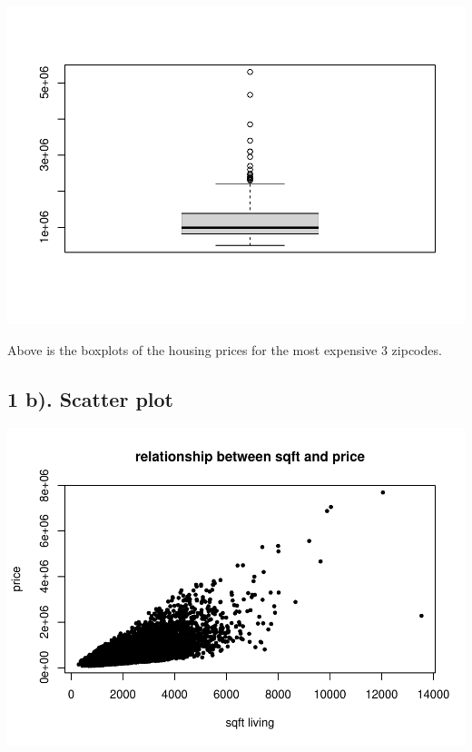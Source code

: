 \documentclass[
]{article}
\newenvironment{Shaded}{\begin{snugshade}}{\end{snugshade}}
\newcommand{\DataTypeTok}[1]{\textcolor[rgb]{0.13,0.29,0.53}{#1}}
\newcommand{\DecValTok}[1]{\textcolor[rgb]{0.00,0.00,0.81}{#1}}
\newcommand{\KeywordTok}[1]{\textcolor[rgb]{0.13,0.29,0.53}{\textbf{#1}}}
\newcommand{\NormalTok}[1]{#1}
\newcommand{\OperatorTok}[1]{\textcolor[rgb]{0.81,0.36,0.00}{\textbf{#1}}}
\newcommand{\StringTok}[1]{\textcolor[rgb]{0.31,0.60,0.02}{#1}}
\begin{document}
\includegraphics{HW2_Liu-Zi-Jian_files/figure-latex/unnamed-chunk-3-3.pdf}

Above is the boxplots of the housing prices for the most expensive 3
zipcodes.

\hypertarget{b.-scatter-plot}{%
\subsection{1 b). Scatter plot}\label{b.-scatter-plot}}

\begin{Shaded}
\end{Shaded}

\includegraphics{HW2_Liu-Zi-Jian_files/figure-latex/unnamed-chunk-4-1.pdf}
\end{document}
